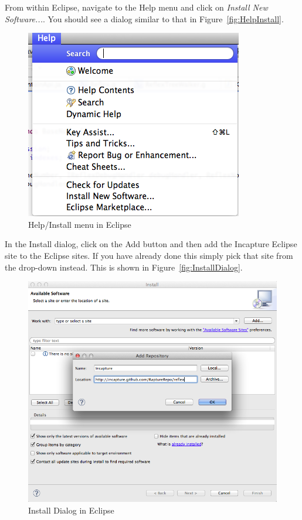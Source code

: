 From within Eclipse, navigate to the Help menu and click on \emph{Install New Software...}. You should see a dialog similar to that in Figure~\vref{fig:HelpInstall}.

\begin{figure}[htb]
\centering
\includegraphics[scale=0.5]{images/HelpInstall.png}
\caption{Help/Install menu in Eclipse}
\label{fig:HelpInstall}
\end{figure}

In the Install dialog, click on the Add button and then add the Incapture \Rapture Eclipse site to the Eclipse sites. If you have already done this simply pick that site from the drop-down instead. This is shown in Figure~\vref{fig:InstallDialog}.

\begin{figure}[htb]
\centering
\includegraphics[scale=0.5]{images/InstallDialog.png}
\caption{Install Dialog in Eclipse}
\label{fig:InstallDialog}
\end{figure}

